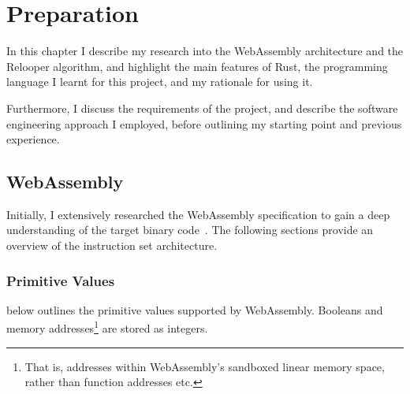 \documentclass[00-main.tex]{subfiles}
\begin{document}
\chapter{Preparation}

In this chapter I describe my research into the WebAssembly architecture and the Relooper algorithm, and highlight the main features of Rust, the programming language I learnt for this project, and my rationale for using it.

Furthermore, I discuss the requirements of the project, and describe the software engineering approach I employed, before outlining my starting point and previous experience.

\section{WebAssembly}

Initially, I extensively researched the WebAssembly specification to gain a deep understanding of the target binary code~.
The following sections provide an overview of the instruction set architecture.

\subsection{Primitive Values}

 below outlines the primitive values supported by WebAssembly.
Booleans and memory addresses\footnote{That is, addresses within WebAssembly's sandboxed linear memory space, rather than function addresses etc.} are stored as integers.

\begin{table}[t]
  \addtolength{\belowcaptionskip}{\medskipamount}
  \centering
  \caption{Summary of the primitive types supported by WebAssembly. The `constructor' is the name of the type in code and in the specification.}
  \label{tab:wasm value types} %
\end{table}
\end{document}
